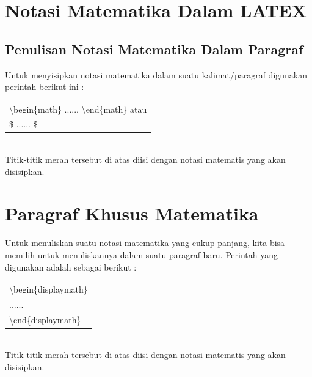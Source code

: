 \section{Notasi Matematika Dalam LATEX}
\subsection{Penulisan Notasi Matematika Dalam Paragraf}
Untuk menyisipkan notasi matematika dalam suatu kalimat/paragraf digunakan perintah berikut ini :\\[0.5 cm]
\begin{tabular}{|p{13.5 cm}|}
\hline
\textbackslash begin\{math\} ...... \textbackslash end\{math\} atau\\
\$ ...... \$\\

\hline
\end{tabular}\\[0.5 cm]
 Titik-titik merah tersebut di atas diisi dengan notasi matematis yang akan disisipkan.
\section{Paragraf Khusus Matematika}
Untuk menuliskan suatu notasi matematika yang cukup panjang, kita bisa memilih untuk menuliskannya dalam suatu paragraf baru. Perintah yang digunakan adalah sebagai berikut :\\[0.5 cm]
\begin{tabular}{|p{13.5 cm}|}
\hline
\textbackslash begin\{displaymath\}\\
......\\
\textbackslash end\{displaymath\}\\
\hline
\end{tabular}\\[0.5 cm]
Titik-titik merah tersebut di atas diisi dengan notasi matematis yang akan disisipkan.
